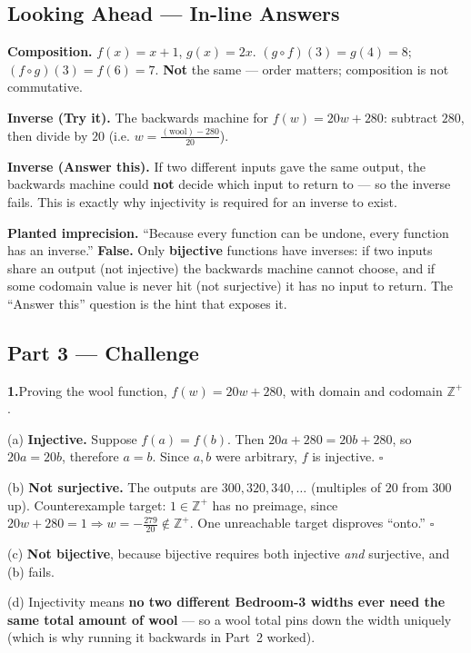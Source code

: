 \documentclass[12pt]{article}
\begin{document}
\subsection*{Looking Ahead --- In-line Answers}

\textbf{Composition.}\; $f(x)=x+1$, $g(x)=2x$. $(g\circ f)(3)=g(4)=8$;\; $(f\circ g)(3)=f(6)=7$. \textbf{Not}
the same --- order matters; composition is not commutative.

\textbf{Inverse (Try it).}\; The backwards machine for $f(w)=20w+280$: subtract $280$, then divide by $20$
(i.e. $w = \tfrac{(\text{wool}) - 280}{20}$).

\textbf{Inverse (Answer this).}\; If two different inputs gave the same output, the backwards machine could
\textbf{not} decide which input to return to --- so the inverse fails. This is exactly why injectivity is
required for an inverse to exist.

\textbf{Planted imprecision.}\; ``Because every function can be undone, every function has an inverse.''
\textbf{False.} Only \textbf{bijective} functions have inverses: if two inputs share an output (not injective)
the backwards machine cannot choose, and if some codomain value is never hit (not surjective) it has no input to
return. The ``Answer this'' question is the hint that exposes it.

\subsection*{Part 3 --- Challenge}

\textbf{1.}\quad Proving the wool function, $f(w)=20w+280$, with domain and codomain $\mathbb{Z}^+$.

(a)\; \textbf{Injective.} Suppose $f(a)=f(b)$. Then $20a+280 = 20b+280$, so $20a=20b$, therefore $a=b$. Since
$a,b$ were arbitrary, $f$ is injective. $\square$

(b)\; \textbf{Not surjective.} The outputs are $300,320,340,\ldots$ (multiples of $20$ from $300$ up).
Counterexample target: $1 \in \mathbb{Z}^+$ has no preimage, since $20w+280=1 \Rightarrow w=-\tfrac{279}{20}
\notin \mathbb{Z}^+$. One unreachable target disproves ``onto.'' $\square$

(c)\; \textbf{Not bijective}, because bijective requires both injective \emph{and} surjective, and (b) fails.

(d)\; Injectivity means \textbf{no two different Bedroom-3 widths ever need the same total amount of wool} --- so
a wool total pins down the width uniquely (which is why running it backwards in Part~2 worked).
\end{document}
